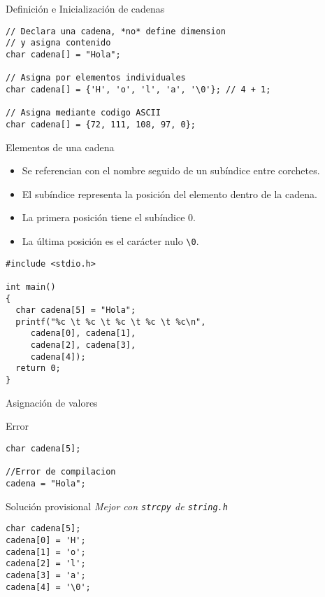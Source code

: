 \documentclass[xcolor={usenames,svgnames,dvipsnames}, aspectratio=169]{beamer}
\begin{document}
\begin{frame}[label={sec:org3da9445},fragile]{Definición e Inicialización de cadenas}
 \lstset{language=C,label= ,caption= ,captionpos=b,numbers=none}
\begin{lstlisting}
// Declara una cadena, *no* define dimension 
// y asigna contenido 
char cadena[] = "Hola"; 

// Asigna por elementos individuales
char cadena[] = {'H', 'o', 'l', 'a', '\0'}; // 4 + 1; 

// Asigna mediante codigo ASCII
char cadena[] = {72, 111, 108, 97, 0}; 
\end{lstlisting}
\end{frame}

\begin{frame}[label={sec:org9764f6e},fragile]{Elementos de una cadena}
 \begin{itemize}
\item Se referencian con el nombre seguido de un subíndice entre corchetes.
\item El subíndice representa la posición del elemento dentro de la cadena.
\item La \alert{primera posición} tiene el \alert{subíndice 0}.
\item La \alert{última posición} es el carácter nulo \texttt{\textbackslash{}0}.
\end{itemize}

\lstset{language=C,label= ,caption= ,captionpos=b,numbers=none}
\begin{lstlisting}
#include <stdio.h>

int main()
{
  char cadena[5] = "Hola";
  printf("%c \t %c \t %c \t %c \t %c\n",
	 cadena[0], cadena[1],
	 cadena[2], cadena[3],
	 cadena[4]);
  return 0;
}
\end{lstlisting}
\end{frame}

\begin{frame}[label={sec:org6a15f69},fragile]{Asignación de valores}
 \begin{block}{Error}
\lstset{language=C,label= ,caption= ,captionpos=b,numbers=none}
\begin{lstlisting}
char cadena[5];

//Error de compilacion
cadena = "Hola";
\end{lstlisting}
\end{block}

\begin{block}{Solución provisional}
\emph{Mejor con \texttt{strcpy} de \texttt{string.h}}

\lstset{language=C,label= ,caption= ,captionpos=b,numbers=none}
\begin{lstlisting}
char cadena[5]; 
cadena[0] = 'H'; 
cadena[1] = 'o'; 
cadena[2] = 'l'; 
cadena[3] = 'a'; 
cadena[4] = '\0';
\end{lstlisting}
\end{block}
\end{frame}
\end{document}
